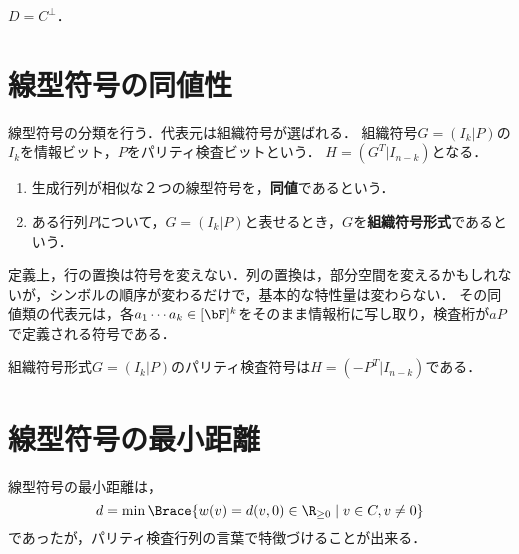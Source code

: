 \documentclass[uplatex,dvipdfmx]{jsreport}
\begin{document}
\begin{lemma}
    $D=C^\perp$．
\end{lemma}

\section{線型符号の同値性}

\begin{tcolorbox}[colframe=ForestGreen, colback=ForestGreen!10!white,breakable,colbacktitle=ForestGreen!40!white,coltitle=black,fonttitle=\bfseries\sffamily,
title=線型符号の統一論]
    線型符号の分類を行う．代表元は組織符号が選ばれる．
    組織符号$G=(I_k|P)$の$I_k$を情報ビット，$P$をパリティ検査ビットという．
    $H=(G^T|I_{n-k})$となる．
\end{tcolorbox}

\begin{definition}\mbox{}
    \begin{enumerate}
        \item 生成行列が相似な２つの線型符号を，\textbf{同値}であるという．
        \item ある行列$P$について，$G=(I_k|P)$と表せるとき，$G$を\textbf{組織符号形式}であるという．
    \end{enumerate}
\end{definition}
\begin{remarks}
    定義上，行の置換は符号を変えない．列の置換は，部分空間を変えるかもしれないが，シンボルの順序が変わるだけで，基本的な特性量は変わらない．
    その同値類の代表元は，各$a_1\cdots a_k\in[\bF]^k$をそのまま情報桁に写し取り，検査桁が$aP$で定義される符号である．
\end{remarks}

\begin{lemma}
    組織符号形式$G=(I_k|P)$のパリティ検査符号は$H=(-P^T|I_{n-k})$である．
\end{lemma}

\section{線型符号の最小距離}

\begin{tcolorbox}[colframe=ForestGreen, colback=ForestGreen!10!white,breakable,colbacktitle=ForestGreen!40!white,coltitle=black,fonttitle=\bfseries\sffamily,
title=]
    線型符号の最小距離は，
    \[d=\min\Brace{w(v)=d(v,0)\in\R_{\ge0}\mid v\in C,v\ne 0}\]
    であったが，パリティ検査行列の言葉で特徴づけることが出来る．
\end{tcolorbox}
\end{document}
